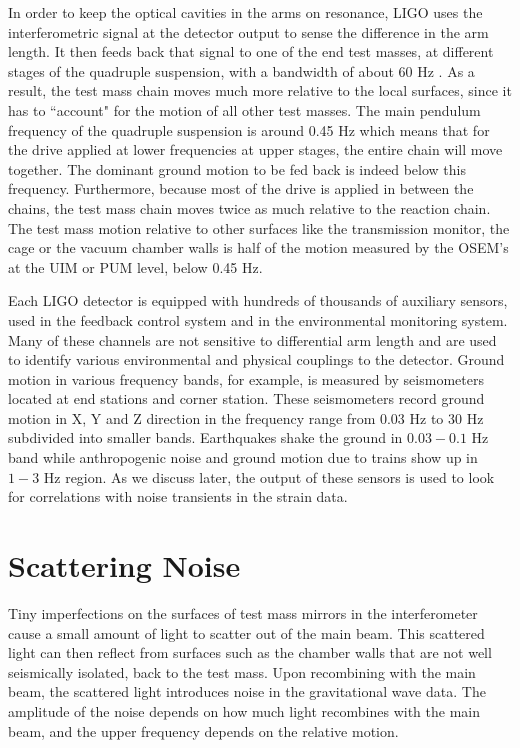 \documentclass[12pt]{iopart}
\begin{document}
In order to keep the optical cavities in the arms on resonance, LIGO uses the interferometric signal at the detector output to sense the difference in the arm length. It then feeds back that signal to one of the end test masses, at different stages of the quadruple suspension, with a bandwidth of about 60 Hz \cite{Martynov_2016}. As a result, the test mass chain moves much more relative to the local surfaces, since it has to ``account" for the motion of all other test masses. The main pendulum frequency of the quadruple suspension is around 0.45 Hz which means that for the drive applied at lower frequencies at upper stages, the entire chain will move together. The dominant ground motion to be fed back is indeed below this frequency. Furthermore, because most of the drive is applied in between the chains, the test mass chain moves twice as much relative to the reaction chain. The test mass motion relative to other surfaces like the transmission monitor, the cage or the vacuum chamber walls is half of the motion measured by the OSEM's at the UIM or PUM level, below 0.45 Hz.

Each LIGO detector is equipped with hundreds of thousands of auxiliary sensors, used in the feedback control system and in the environmental monitoring system. Many of these channels are not sensitive to differential arm length and are used to identify various environmental and physical couplings to the detector.
Ground motion in various frequency bands, for example, is measured by seismometers located at end stations and corner station. These seismometers record ground motion in X, Y and Z direction in the frequency range from 0.03 Hz to 30 Hz subdivided into smaller bands. Earthquakes shake the ground in $0.03-0.1$ Hz band while anthropogenic noise and ground motion due to trains show up in $1-3$ Hz region. As we discuss later, the output of these sensors is used to look for correlations with noise transients in the strain data.



 
\section{Scattering Noise}\label{scatteringnoise}
Tiny imperfections on the surfaces of test mass mirrors in the interferometer cause a small amount of light to scatter out of the main beam. This scattered light can then reflect from surfaces such as the chamber walls that are not well seismically isolated, back to the test mass. Upon recombining with the main beam, the scattered light introduces noise in the gravitational wave data. The amplitude of the noise depends on how much light recombines with the main beam, and the upper frequency depends on the relative motion.
\end{document}
